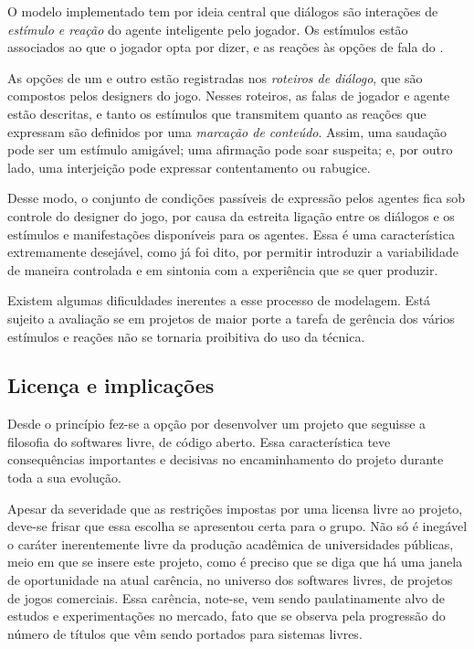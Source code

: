 O modelo implementado tem por ideia central que diálogos são
interações de \emph{estímulo e reação} do agente inteligente pelo
jogador. Os estímulos estão associados ao que o jogador opta por
dizer, e as reações às opções de fala do \npc. 

As opções de um e outro estão registradas nos \emph{roteiros de
  diálogo}, que são compostos pelos designers do jogo. Nesses
roteiros, as falas de jogador e agente estão descritas, e tanto os
estímulos que transmitem quanto as reações que expressam são definidos
por uma \emph{marcação de conteúdo}. Assim, uma saudação pode ser um
estímulo amigável; uma afirmação pode soar suspeita; e, por outro
lado, uma interjeição pode expressar contentamento ou rabugice.

Desse modo, o conjunto de condições passíveis de
expressão pelos agentes fica sob controle do designer do jogo, por
causa da estreita ligação entre os diálogos e os estímulos e
manifestações disponíveis para os agentes. Essa é uma característica
extremamente desejável, como já foi dito, por permitir introduzir a
variabilidade de maneira controlada e em sintonia com a experiência
que se quer produzir.

Existem algumas dificuldades inerentes a esse processo de
modelagem. Está sujeito a avaliação se em projetos de maior porte a
tarefa de gerência dos vários estímulos e reações não se tornaria
proibitiva do uso da técnica.

\subsection{Licença e implicações}

Desde o princípio fez-se a opção por desenvolver um projeto que seguisse a filosofia do softwares livre, de código aberto. Essa característica teve consequências importantes e decisivas no encaminhamento do projeto durante toda a sua evolução. 

Apesar da severidade que as restrições impostas por uma licensa livre ao projeto, deve-se frisar que essa escolha se apresentou certa para o grupo. Não só é inegável o caráter inerentemente livre da produção acadêmica de universidades públicas, meio em que se insere este projeto, como é preciso que se diga que há uma janela de oportunidade na atual carência, no universo dos softwares livres, de projetos de jogos comerciais. Essa carência, note-se, vem sendo paulatinamente alvo de estudos e experimentações no mercado, fato que se observa pela progressão do número de títulos que vêm sendo portados para sistemas livres.

